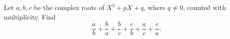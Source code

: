 Let $a,b,c$ be the complex roots of $X^3+pX+q$, where $q\ne0$, counted with multiplicity. Find
\[\dfrac{a}{b}+\dfrac{b}{a}+\dfrac{b}{c}+\dfrac{c}{b}+\dfrac{a}{c}+\dfrac{c}{a}.\]
